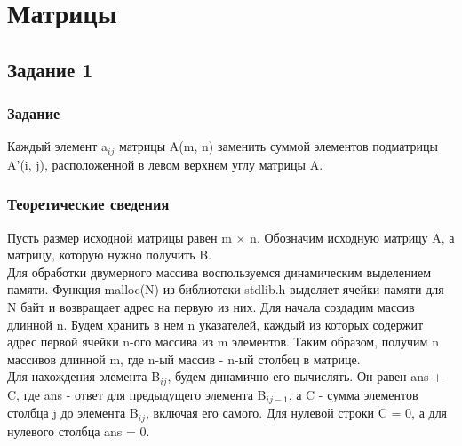 \documentclass[12pt,a4paper]{report}
\begin{document}
\chapter{Матрицы}
\section{Задание 1}
\subsection{Задание}
Каждый элемент a$_{i j}$ матрицы A(m, n) заменить суммой элементов подматрицы A'(i, j), расположенной в левом верхнем углу матрицы A.
\subsection{Теоретические сведения}
Пусть размер исходной матрицы равен m $\times$ n. Обозначим исходную матрицу A, а матрицу, которую нужно  получить B.\\
Для обработки двумерного массива воспользуемся динамическим выделением памяти. Функция malloc(N) из библиотеки stdlib.h выделяет ячейки памяти для N байт и возвращает адрес на первую из них. Для начала создадим массив длинной n. Будем хранить в нем n указателей, каждый из которых содержит адрес первой ячейки n-ого массива из m элементов. Таким образом, получим n массивов длинной m, где n-ый массив - n-ый столбец в матрице. \\
Для нахождения элемента B$_{i j}$, будем динамично его вычислять. Он равен ans + C, где ans - ответ для предыдущего элемента B$_{i j-1}$, а C - сумма элементов столбца j до элемента B$_{i j}$, включая его самого. Для нулевой строки C = 0, а для нулевого столбца ans = 0.
\end{document}
